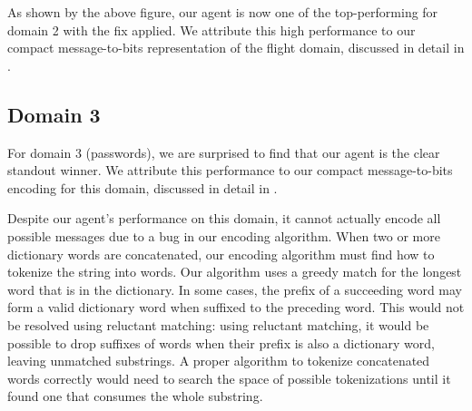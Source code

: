 \documentclass[titlepage]{article}
\begin{document}
As shown by the above figure, our agent is now one of the top-performing for domain 2 with the fix applied. We attribute this high performance to our compact message-to-bits representation of the flight domain, discussed in detail in .

\subsection{Domain 3}
For domain 3 (passwords), we are surprised to find that our agent is the clear standout winner. We attribute this performance to our compact message-to-bits encoding for this domain, discussed in detail in .

Despite our agent's performance on this domain, it cannot actually encode all possible messages due to a bug in our encoding algorithm. When two or more dictionary words are concatenated, our encoding algorithm must find how to tokenize the string into words. Our algorithm uses a greedy match for the longest word that is in the dictionary. In some cases, the prefix of a succeeding word may form a valid dictionary word when suffixed to the preceding word. This would not be resolved using reluctant matching: using reluctant matching, it would be possible to drop suffixes of words when their prefix is also a dictionary word, leaving unmatched substrings. A proper algorithm to tokenize concatenated words correctly would need to search the space of possible tokenizations until it found one that consumes the whole substring.
\end{document}
